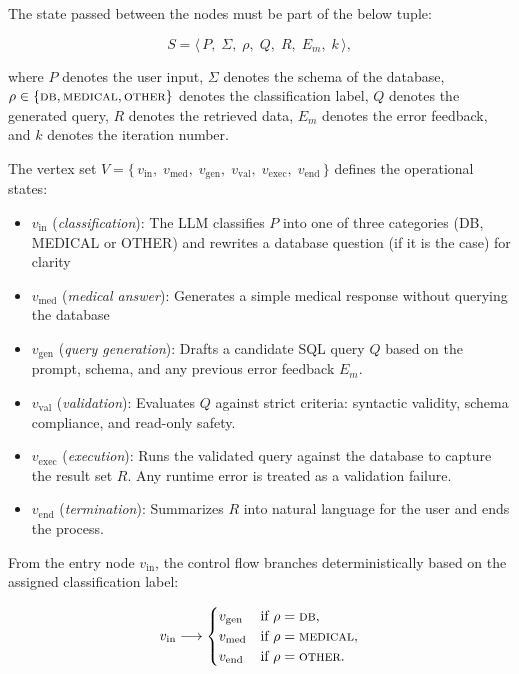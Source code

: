 \vspace{1em}

The state passed between the nodes must be part of the below tuple:

\begin{equation}
    S = \langle\, P,\; \Sigma,\; \rho,\; Q,\; R,\; E_m,\; k \,\rangle,
    \label{eq:state}
\end{equation}

where $P$ denotes the user input, $\Sigma$ denotes the schema of the database, $\rho \in \{\textsc{db}, \textsc{medical}, \textsc{other}\}$ denotes the classification label, $Q$ denotes the generated query, $R$ denotes the retrieved data, $E_m$ denotes the error feedback, and $k$ denotes the iteration number.

The vertex set $V = \{\, v_{\mathrm{in}},\; v_{\mathrm{med}},\; v_{\mathrm{gen}},\; v_{\mathrm{val}},\; v_{\mathrm{exec}},\; v_{\mathrm{end}} \,\}$ defines the operational states:

\begin{itemize}
    \item $v_{\mathrm{in}}$ (\emph{classification}): The LLM classifies $P$ into one of three categories  (DB, MEDICAL or OTHER) and rewrites a database question (if it is the case) for clarity
    \item $v_{\mathrm{med}}$ (\emph{medical answer}): Generates a simple medical response without querying the database
    \item $v_{\mathrm{gen}}$ (\emph{query generation}): Drafts a candidate SQL query $Q$ based on the prompt, schema, and any previous error feedback $E_m$.
    \item $v_{\mathrm{val}}$ (\emph{validation}): Evaluates $Q$ against strict criteria: syntactic validity, schema compliance, and read-only safety.
    \item $v_{\mathrm{exec}}$ (\emph{execution}): Runs the validated query against the database to capture the result set $R$. Any runtime error is treated as a validation failure.
    \item $v_{\mathrm{end}}$ (\emph{termination}): Summarizes $R$ into natural language for the user and ends the process.
\end{itemize}

From the entry node $v_{\mathrm{in}}$, the control flow branches deterministically based on the assigned classification label:

\begin{equation}
    v_{\mathrm{in}} \longrightarrow
    \begin{cases}
        v_{\mathrm{gen}} & \text{if } \rho = \textsc{db},\\
        v_{\mathrm{med}} & \text{if } \rho = \textsc{medical},\\
        v_{\mathrm{end}} & \text{if } \rho = \textsc{other}.
    \end{cases}
    \label{eq:branch}
\end{equation}

